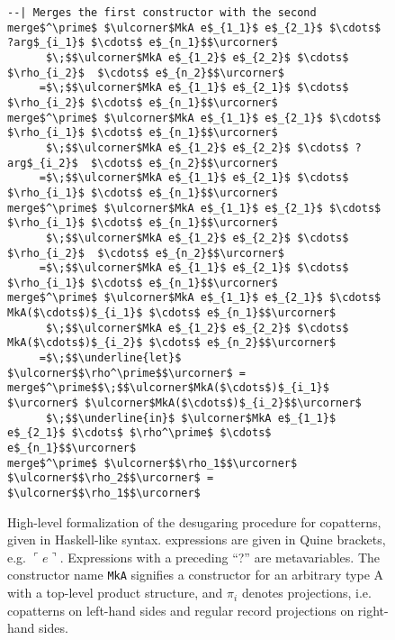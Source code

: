 \begin{figure}
\begin{lstlisting}[mathescape]
--| Merges the first constructor with the second
merge$^\prime$ $\ulcorner$MkA e$_{1_1}$ e$_{2_1}$ $\cdots$ ?arg$_{i_1}$ $\cdots$ e$_{n_1}$$\urcorner$
      $\;$$\ulcorner$MkA e$_{1_2}$ e$_{2_2}$ $\cdots$ $\rho_{i_2}$  $\cdots$ e$_{n_2}$$\urcorner$
     =$\;$$\ulcorner$MkA e$_{1_1}$ e$_{2_1}$ $\cdots$ $\rho_{i_2}$ $\cdots$ e$_{n_1}$$\urcorner$
merge$^\prime$ $\ulcorner$MkA e$_{1_1}$ e$_{2_1}$ $\cdots$ $\rho_{i_1}$ $\cdots$ e$_{n_1}$$\urcorner$
      $\;$$\ulcorner$MkA e$_{1_2}$ e$_{2_2}$ $\cdots$ ?arg$_{i_2}$  $\cdots$ e$_{n_2}$$\urcorner$
     =$\;$$\ulcorner$MkA e$_{1_1}$ e$_{2_1}$ $\cdots$ $\rho_{i_1}$ $\cdots$ e$_{n_1}$$\urcorner$
merge$^\prime$ $\ulcorner$MkA e$_{1_1}$ e$_{2_1}$ $\cdots$ $\rho_{i_1}$ $\cdots$ e$_{n_1}$$\urcorner$
      $\;$$\ulcorner$MkA e$_{1_2}$ e$_{2_2}$ $\cdots$ $\rho_{i_2}$  $\cdots$ e$_{n_2}$$\urcorner$
     =$\;$$\ulcorner$MkA e$_{1_1}$ e$_{2_1}$ $\cdots$ $\rho_{i_1}$ $\cdots$ e$_{n_1}$$\urcorner$
merge$^\prime$ $\ulcorner$MkA e$_{1_1}$ e$_{2_1}$ $\cdots$ MkA($\cdots$)$_{i_1}$ $\cdots$ e$_{n_1}$$\urcorner$
      $\;$$\ulcorner$MkA e$_{1_2}$ e$_{2_2}$ $\cdots$ MkA($\cdots$)$_{i_2}$ $\cdots$ e$_{n_2}$$\urcorner$
     =$\;$$\underline{let}$ $\ulcorner$$\rho^\prime$$\urcorner$ = merge$^\prime$$\;$$\ulcorner$MkA($\cdots$)$_{i_1}$ $\urcorner$ $\ulcorner$MkA($\cdots$)$_{i_2}$$\urcorner$
      $\;$$\underline{in}$ $\ulcorner$MkA e$_{1_1}$ e$_{2_1}$ $\cdots$ $\rho^\prime$ $\cdots$ e$_{n_1}$$\urcorner$
merge$^\prime$ $\ulcorner$$\rho_1$$\urcorner$ $\ulcorner$$\rho_2$$\urcorner$ = $\ulcorner$$\rho_1$$\urcorner$
\end{lstlisting}
\caption{High-level formalization of the desugaring procedure for copatterns,
  given in Haskell-like syntax. \IdrisM{} expressions are given in Quine
  brackets, e.g. $\ulcorner e\urcorner$. Expressions with a preceding ``?'' are
  \IdrisM{} metavariables. The constructor name \texttt{MkA} signifies a
  constructor for an arbitrary type A with a top-level product structure, and $\pi_i$ denotes projections,
  i.e. copatterns on left-hand sides and regular record projections on right-hand sides.}
\label{fig:desugaring_formalization}
\end{figure}

